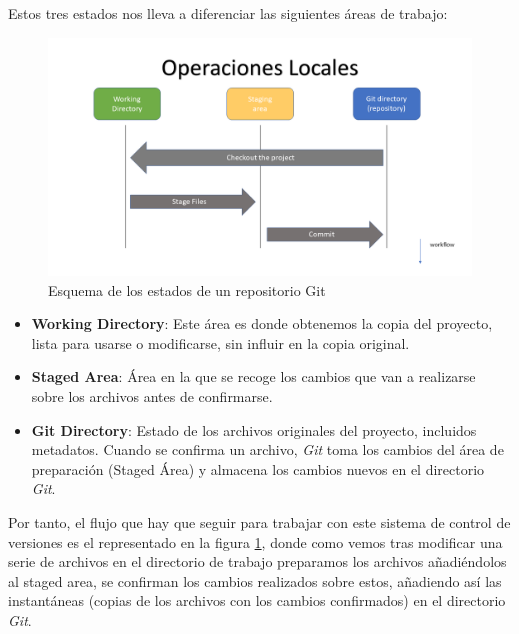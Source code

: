 Estos tres estados nos lleva a diferenciar las siguientes áreas de trabajo: \\
\begin{figure}[ht]
    \centering
    \includegraphics[width=\textwidth]{img/git_states.png}
    \caption{ Esquema de los estados de un repositorio Git}
    \label{fig:gitStates}
\end{figure}
\begin{itemize}
    \item \textbf{Working Directory}: Este área es donde obtenemos la copia del proyecto, lista para usarse o modificarse, sin influir en la copia original.
    \item \textbf{Staged Area}: Área en la que se recoge los cambios que van a realizarse sobre los archivos antes de confirmarse.
    \item \textbf{Git Directory}: Estado de los archivos originales del proyecto, incluidos metadatos. Cuando se confirma un archivo, \emph{Git} toma los cambios del área de preparación (Staged Área) y almacena los cambios nuevos en el directorio \emph{Git}.
\end{itemize}
Por tanto, el flujo que hay que seguir para trabajar con este sistema de control de versiones es el representado en la figura \ref{fig:gitStates}, donde como vemos tras modificar una serie de archivos en el directorio de trabajo preparamos los archivos añadiéndolos al staged area, se confirman los cambios realizados sobre estos, añadiendo así las instantáneas (copias de los archivos con los cambios confirmados) en el directorio \emph{Git}.

